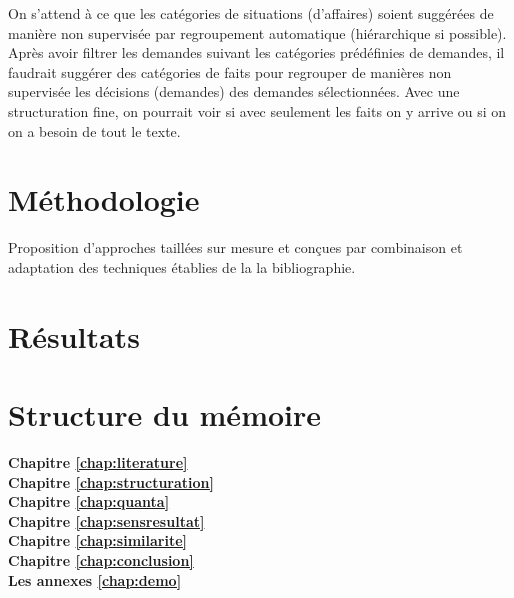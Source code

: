 On s'attend à ce que les catégories de situations (d'affaires) soient suggérées de manière non supervisée par regroupement automatique (hiérarchique si possible). Après avoir filtrer les demandes suivant les catégories prédéfinies de demandes, il faudrait suggérer des catégories de faits pour regrouper de manières non supervisée les décisions (demandes) des demandes sélectionnées. Avec une structuration fine, on pourrait voir si avec seulement les faits on y arrive ou si on on a besoin de tout le texte.


\section{Méthodologie}
\label{sec:intro:methodologie}
Proposition d'approches taillées sur mesure et conçues par combinaison et adaptation des techniques établies de la la bibliographie.

\section{Résultats}
\label{sec:intro:résultats}


\section{Structure du mémoire}
\label{sec:intro:organisation}

\textbf{Chapitre \ref{chap:literature}} \\[0.2em]

\textbf{Chapitre \ref{chap:structuration}} \\[0.2em]

\textbf{Chapitre \ref{chap:quanta}} \\[0.2em]

\textbf{Chapitre \ref{chap:sensresultat}} \\[0.2em]

\textbf{Chapitre \ref{chap:similarite}} \\[0.2em]

\textbf{Chapitre \ref{chap:conclusion}} \\[0.2em]

\textbf{Les annexes \ref{chap:demo}} \\[0.2em]

